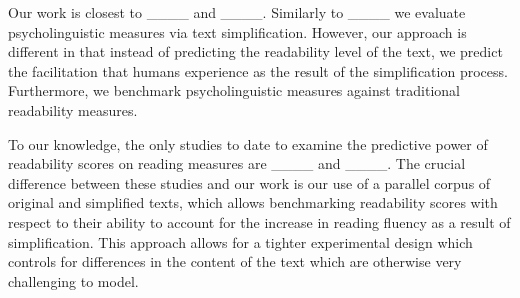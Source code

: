 Our work is closest to ____ and ____. Similarly to ____ we evaluate  psycholinguistic measures via text simplification. However, our approach is different in that instead of predicting the readability level of the text, we predict the facilitation that humans experience as the result of the simplification process. Furthermore, we benchmark psycholinguistic measures against traditional readability measures. 

To our knowledge, the only studies to date to examine the predictive power of readability scores on reading measures are ____ and ____. The crucial difference between these studies and our work is our use of a parallel corpus of original and simplified texts, which allows benchmarking readability scores with respect to their ability to account for the increase in reading fluency as a result of simplification. This approach allows for a tighter experimental design which controls for differences in the content of the text which are otherwise very challenging to model.